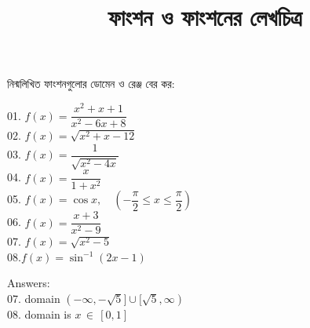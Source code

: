\documentclass{article}
\title{ফাংশন ও ফাংশনের লেখচিত্র\vspace{-2em}}
\date{\vspace{-5ex}}
\begin{document}
\maketitle
\begin{center}
নিন্মলিখিত ফাংশনগুলোর  ডোমেন ও রেঞ্জ বের কর:
\end{center}
\begin{multicols*}{2}


\hspace*{-2em} 01.  $f(x) = \dfrac{x^2 + x +1}{x^2-6x+8}$\\02. $f(x) = \sqrt{x^2+x-12}$\\03. $f(x) = \dfrac{1}{\sqrt{x^2 -4x}}$\\ 04. $f(x) = \dfrac{x}{1+x^2}$\\ 05. $f(x) = \cos x, \quad (-\dfrac{\pi}{2}\le x \le \dfrac{\pi}{2})$\\06. $f(x) = \dfrac{x+3}{x^2-9}$\\07. $f(x) =\sqrt{x^2-5}$\\08.$f(x) =\sin^{-1}(2x-1)$


Answers:\\
07. domain $(-\infty,-\sqrt{5}]\cup [\sqrt{5}, \infty )$\\
08. domain is $x\,\in\, [0,1]$
\end{multicols*}
\end{document}

